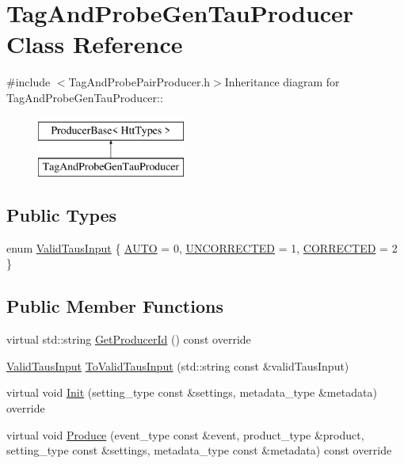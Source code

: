 \hypertarget{classTagAndProbeGenTauProducer}{
\section{TagAndProbeGenTauProducer Class Reference}
\label{classTagAndProbeGenTauProducer}
}


{\ttfamily \#include $<$TagAndProbePairProducer.h$>$}Inheritance diagram for TagAndProbeGenTauProducer::\begin{figure}[H]
\begin{center}
\leavevmode
\includegraphics[height=2cm]{classTagAndProbeGenTauProducer}
\end{center}
\end{figure}
\subsection*{Public Types}
\begin{DoxyCompactItemize}
\item 
enum \hyperlink{classTagAndProbeGenTauProducer_a0e44e46c7b574f598c55a7a411fc30c6}{ValidTausInput} \{ \hyperlink{classTagAndProbeGenTauProducer_a0e44e46c7b574f598c55a7a411fc30c6a9eaa737902c72bcc894f68cc70ef5894}{AUTO} =  0, 
\hyperlink{classTagAndProbeGenTauProducer_a0e44e46c7b574f598c55a7a411fc30c6a1b0d0262f687d1afd84de3c8f86ed6af}{UNCORRECTED} =  1, 
\hyperlink{classTagAndProbeGenTauProducer_a0e44e46c7b574f598c55a7a411fc30c6abfb212833a7c959ec2d13b486ea55816}{CORRECTED} =  2
 \}
\end{DoxyCompactItemize}
\subsection*{Public Member Functions}
\begin{DoxyCompactItemize}
\item 
virtual std::string \hyperlink{classTagAndProbeGenTauProducer_a4239217a44949b55ef50e7934d8815ec}{GetProducerId} () const override
\item 
\hyperlink{classTagAndProbeGenTauProducer_a0e44e46c7b574f598c55a7a411fc30c6}{ValidTausInput} \hyperlink{classTagAndProbeGenTauProducer_a9f5580083fbd5b20c323d81ac125dec0}{ToValidTausInput} (std::string const \&validTausInput)
\item 
virtual void \hyperlink{classTagAndProbeGenTauProducer_a169bc17afdc619c9c59444736453735c}{Init} (setting\_\-type const \&settings, metadata\_\-type \&metadata) override
\item 
virtual void \hyperlink{classTagAndProbeGenTauProducer_a6e4ea2e9ca481194b22bd06c34815d92}{Produce} (event\_\-type const \&event, product\_\-type \&product, setting\_\-type const \&settings, metadata\_\-type const \&metadata) const override
\end{DoxyCompactItemize}


